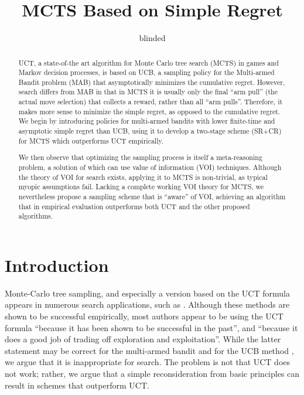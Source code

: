\documentclass[letterpaper]{article}
\title{MCTS Based on Simple Regret}
\author {blinded}
\begin{document}
\maketitle

\begin{abstract}
UCT, a state-of-the art algorithm for Monte Carlo tree search (MCTS)
in games and Markov decision processes, is based on UCB, a sampling
policy for the Multi-armed Bandit problem (MAB) that asymptotically
minimizes the cumulative regret.  However, search differs from MAB in
that in MCTS it is usually only the final ``arm pull'' (the actual
move selection) that collects a reward, rather than all ``arm pulls''.
Therefore, it makes more sense to minimize the simple regret, as
opposed to the cumulative regret. We begin by introducing policies for
multi-armed bandits with lower finite-time and asymptotic simple
regret than UCB, using it to develop a two-stage scheme (SR+CR) for MCTS
which outperforms UCT empirically.

We then observe that optimizing the sampling process is itself a
meta-reasoning problem, a solution of which can use value of
information (VOI) techniques.  Although the theory of VOI for search
exists, applying it to MCTS is non-trivial, as typical myopic
assumptions fail. Lacking a complete working VOI theory for MCTS, we
nevertheless propose a sampling scheme that is ``aware'' of VOI,
achieving an algorithm that in empirical evaluation outperforms 
both UCT and the other proposed algorithms.
\end{abstract}

\section{Introduction}

Monte-Carlo tree sampling, and especially a version based on the
UCT formula \cite{Kocsis.uct} appears in numerous search applications,
such as \cite{Eyerich.ctp}. Although these methods are shown to be successful empirically,
most authors appear to be using the UCT formula ``because it has been shown
to be successful in the past'', and ``because it does a good job of
trading off exploration and exploitation''. While the latter statement may be
correct for the multi-armed bandit and for the UCB method \cite{Auer.ucb},
we argue that it is inappropriate for search. The problem is not that
UCT does not work; rather, we argue that a simple reconsideration from basic
principles can result in schemes that outperform UCT.
\end{document}
